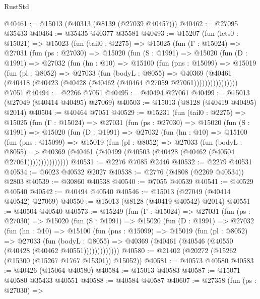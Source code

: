 \begin{lexlean}{RustStd}
\begin{coremodule}
@40461 := @15013 (@40313 (@8139 (@27039 @40457)))
@40462 := @27095 @35433
@40464 := @35435 @40377 @35581
@40493 := @15207
    (fun (lets0 : @15021) =>
    @15023
      (fun (tail0 : @2275) =>
      @15025
        (fun (Γ : @15024) =>
        @27031
          (fun (ps : @27030) =>
          @15020
            (fun (S : @1991) =>
            @15020
              (fun (D : @1991) =>
              @27032
                (fun (hn : @10) =>
                @15100
                  (fun (pns : @15099) =>
                  @15019
                    (fun (pl : @8052) =>
                    @27033
                      (fun (bodyL : @8055) =>
                      @40369
                        (@40461
                          (@40418 (@40423 (@40428 (@40462 (@40464 @27059 @27061))))))))))))))))
    @7051
@40494 := @2266 @7051
@40495 := @40494 @27061
@40499 := @15013 (@27049 (@40414 @40495) @27069)
@40503 := @15013 (@8128 (@40419 @40495) @2014)
@40504 := @40464 @7051
@40529 := @15231
    (fun (tail0 : @2275) =>
    @15025
      (fun (Γ : @15024) =>
      @27031
        (fun (ps : @27030) =>
        @15020
          (fun (S : @1991) =>
          @15020
            (fun (D : @1991) =>
            @27032
              (fun (hn : @10) =>
              @15100
                (fun (pns : @15099) =>
                @15019
                  (fun (pl : @8052) =>
                  @27033
                    (fun (bodyL : @8055) =>
                    @40369 (@40461 (@40499 (@40503 (@40428 (@40462 (@40504 @27061)))))))))))))))
@40531 := @2276 @7085 @2446
@40532 := @2279 @40531
@40534 := @6023 @40532 @2027
@40538 := @2776 (@4808 (@2269 @40534)) @2803
@40539 := @30860 @40538
@40540 := @7055 @40539
@40541 := @40529 @40540
@40542 := @40494 @40540
@40546 := @15013 (@27049 (@40414 @40542) @27069)
@40550 := @15013 (@8128 (@40419 @40542) @2014)
@40551 := @40504 @40540
@40573 := @15249
    (fun (Γ : @15024) =>
    @27031
      (fun (ps : @27030) =>
      @15020
        (fun (S : @1991) =>
        @15020
          (fun (D : @1991) =>
          @27032
            (fun (hn : @10) =>
            @15100
              (fun (pns : @15099) =>
              @15019
                (fun (pl : @8052) =>
                @27033
                  (fun (bodyL : @8055) =>
                  @40369 (@40461 (@40546 (@40550 (@40428 (@40462 @40551)))))))))))))
@40580 := @21402 (@20272 (@15262 (@15300 (@15267 @1767 @15301)) @15052))
@40581 := @40573 @40580
@40583 := @40426 (@15064 @40580)
@40584 := @15013 @40583
@40587 := @15071 @40580 @35433 @40551
@40588 := @40584 @40587
@40607 := @27358
    (fun (ps : @27030) =>

\end{coremodule}
\end{lexlean}
